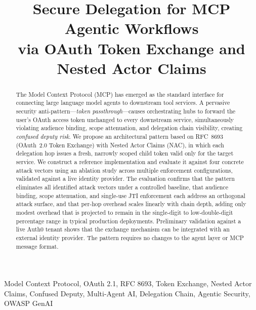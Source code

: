 \documentclass[journal]{IEEEtran}
\theoremstyle{definition}
\begin{document}
\title{Secure Delegation for MCP Agentic Workflows\\
via OAuth Token Exchange and Nested Actor Claims}

\author{
}

\maketitle

\begin{abstract}
The Model Context Protocol (MCP) has emerged as the standard interface for
connecting large language model agents to downstream tool services. A pervasive
security anti-pattern---\textit{token passthrough}---causes orchestrating hubs
to forward the user's OAuth access token unchanged to every downstream service,
simultaneously violating audience binding, scope attenuation, and delegation
chain visibility, creating \textit{confused deputy risk}. We propose
an architectural pattern based on RFC~8693 (OAuth~2.0 Token Exchange) with
Nested Actor Claims (NAC), in which each delegation hop issues a fresh,
narrowly scoped child token valid only for the target service. We construct a
reference implementation and evaluate it against four concrete attack vectors
using an ablation study across multiple enforcement configurations, validated
against a live identity provider. The evaluation confirms that the pattern
eliminates all identified attack vectors under a controlled baseline, that
audience binding, scope attenuation, and single-use JTI enforcement each
address an orthogonal attack surface, and that per-hop overhead scales
linearly with chain depth, adding only modest overhead that is projected to
remain in the single-digit to low-double-digit percentage range in typical
production deployments. Preliminary validation against a live Auth0 tenant shows that the exchange
mechanism can be integrated with an external identity provider. The pattern
requires no changes to the agent layer or MCP message format.
\end{abstract}

\begin{IEEEkeywords}
Model Context Protocol, OAuth 2.1, RFC 8693, Token Exchange, Nested Actor Claims,
Confused Deputy, Multi-Agent AI, Delegation Chain, Agentic Security, OWASP GenAI
\end{IEEEkeywords}
\end{document}
